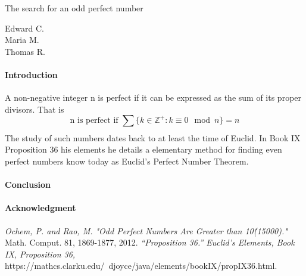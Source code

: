 \documentclass[12pt]{article}
\begin{document}
\begin{center}
\Large
The search for an odd perfect number
\end{center}

\begin{flushright}
Edward C.\\
\vspace{2 mm}
Maria M.\\
\vspace{2 mm}
Thomas R.\\
\end{flushright}

\paragraph*{Introduction}
A non-negative integer n is perfect if it can be expressed as the sum of its proper divisors.  
That is $$\text{n is perfect if }\sum_{}{}\{k \in \mathbb{Z}^+ : k \equiv 0 \mod n\} = n$$
The study of such numbers dates back to at least the time of Euclid. In Book IX Proposition 36 his elements he details a elementary method for finding even perfect numbers know today as Euclid’s Perfect Number Theorem.
\paragraph*{Conclusion}

\paragraph*{Acknowledgment}


\begin{thebibliography}{5}
\textit{Ochem, P. and Rao, M. "Odd Perfect Numbers Are Greater than 10\^(15000)."} Math. Comput. 81, 1869-1877, 2012.
\textit{“Proposition 36.” Euclid's Elements, Book IX, Proposition 36,} https://mathcs.clarku.edu/~djoyce/java/elements/bookIX/propIX36.html.
\end{thebibliography}
\end{document}

